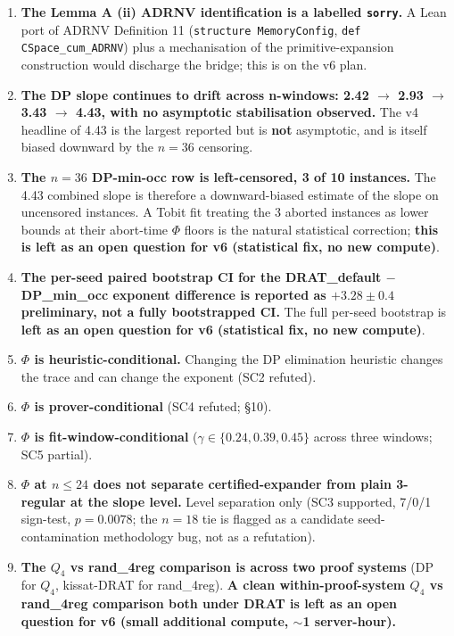 \documentclass[11pt,a4paper]{article}
\theoremstyle{remark}
\begin{document}
{\begin{enumerate}
\item \textbf{The Lemma A (ii) ADRNV identification is a labelled
\texttt{sorry}.} A Lean port of ADRNV Definition 11 (\texttt{structure
MemoryConfig}, \texttt{def CSpace\_cum\_ADRNV}) plus a mechanisation of
the primitive-expansion construction would discharge the bridge; this is
on the v6 plan.

\item \textbf{The DP slope continues to drift across n-windows: 2.42
$\to$ 2.93 $\to$ 3.43 $\to$ 4.43, with no asymptotic stabilisation
observed.} The v4 headline of 4.43 is the largest reported but is
\textbf{not} asymptotic, and is itself biased downward by the $n=36$
censoring.

\item \textbf{The $n=36$ DP-min-occ row is left-censored, 3 of 10
instances.} The 4.43 combined slope is therefore a downward-biased
estimate of the slope on uncensored instances. A Tobit fit treating the
3 aborted instances as lower bounds at their abort-time $\Phi$ floors is
the natural statistical correction; \textbf{this is left as an open
question for v6 (statistical fix, no new compute)}.

\item \textbf{The per-seed paired bootstrap CI for the DRAT\_default $-$
DP\_min\_occ exponent difference is reported as $+3.28 \pm 0.4$
preliminary, not a fully bootstrapped CI.} The full per-seed bootstrap
is \textbf{left as an open question for v6 (statistical fix, no new
compute)}.

\item \textbf{$\Phi$ is heuristic-conditional.} Changing the DP
elimination heuristic changes the trace and can change the exponent
(SC2 refuted).

\item \textbf{$\Phi$ is prover-conditional} (SC4 refuted; \S10).

\item \textbf{$\Phi$ is fit-window-conditional} ($\gamma \in \{0.24,
0.39, 0.45\}$ across three windows; SC5 partial).

\item \textbf{$\Phi$ at $n \le 24$ does not separate certified-expander
from plain 3-regular at the slope level.} Level separation only (SC3
supported, 7/0/1 sign-test, $p = 0.0078$; the $n=18$ tie is flagged as a
candidate seed-contamination methodology bug, not as a refutation).

\item \textbf{The $Q_4$ vs rand\_4reg comparison is across two proof
systems} (DP for $Q_4$, kissat-DRAT for rand\_4reg). \textbf{A clean
within-proof-system $Q_4$ vs rand\_4reg comparison both under DRAT is
left as an open question for v6 (small additional compute, $\sim$1
server-hour).}


\end{enumerate}}
\end{document}
